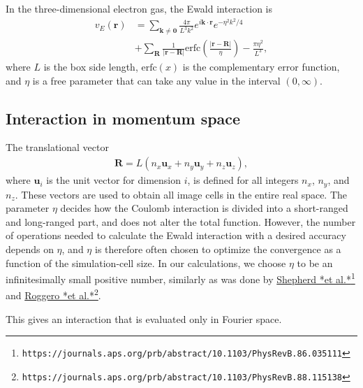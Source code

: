 \documentclass[graybox,sectrefs,envcountresetchap,open=right]{svmonodo}
\begin{document}
In the three-dimensional electron gas, the Ewald 
interaction is 
\begin{align}
  v_{E}(\mathbf{r}) &= \sum_{\mathbf{k} \neq \mathbf{0}}
  \frac{4\pi }{L^{3}k^{2}}e^{i\mathbf{k}\cdot \mathbf{r}}
  e^{-\eta^{2}k^{2}/4} \nonumber \\
  &+ \sum_{\mathbf{R}}\frac{1}{\left| \mathbf{r}
    -\mathbf{R}\right| } \mathrm{erfc} \left( \frac{\left| 
    \mathbf{r}-\mathbf{R}\right|}{\eta }\right)
  - \frac{\pi \eta^{2}}{L^{3}},
\end{align}
where $L$ is the box side length, $\mathrm{erfc}(x)$ is the 
complementary error function, and $\eta $ is a free
parameter that can take any value in the interval 
$(0, \infty )$.



\subsection{Interaction in momentum space}

The translational vector 
\begin{align}
  \mathbf{R} = L\left(n_{x}\mathbf{u}_{x} + n_{y}
  \mathbf{u}_{y} + n_{z}\mathbf{u}_{z}\right) ,
\end{align}
where $\mathbf{u}_{i}$ is the unit vector for dimension $i$,
is defined for all integers $n_{x}$, $n_{y}$, and 
$n_{z}$. These vectors are used to obtain all image
cells in the entire real space. 
The parameter $\eta $ decides how 
the Coulomb interaction is divided into a short-ranged
and long-ranged part, and does not alter the total
function. However, the number of operations needed
to calculate the Ewald interaction with a desired 
accuracy depends on $\eta $, and $\eta $ is therefore 
often chosen to optimize the convergence as a function
of the simulation-cell size. In
our calculations, we choose $\eta $ to be an infinitesimally
small positive number, similarly as was done by \href{{https://journals.aps.org/prb/abstract/10.1103/PhysRevB.86.035111}}{Shepherd *et al.*}\footnote{\texttt{https://journals.aps.org/prb/abstract/10.1103/PhysRevB.86.035111}} and \href{{https://journals.aps.org/prb/abstract/10.1103/PhysRevB.88.115138}}{Roggero *et al.*}\footnote{\texttt{https://journals.aps.org/prb/abstract/10.1103/PhysRevB.88.115138}}.

This gives an interaction that is evaluated only in
Fourier space. 
\end{document}
